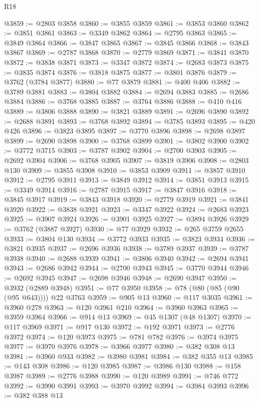 \begin{lexlean}{R18}
\begin{coremodule}
@3859 := @2803 @3858
@3860 := @3855 @3859
@3861 := @3853 @3860
@3862 := @3851 @3861
@3863 := @3349 @3862
@3864 := @2795 @3863
@3865 := @3849 @3864
@3866 := @3847 @3865
@3867 := @3845 @3866
@3868 := @3843 @3867
@3869 := @2787 @3868
@3870 := @2779 @3869
@3871 := @3841 @3870
@3872 := @3838 @3871
@3873 := @3347 @3872
@3874 := @2683 @3873
@3875 := @3835 @3874
@3876 := @3818 @3875
@3877 := @3801 @3876
@3879 := @3762 (@3784 @3877)
@3880 := @77 @3879
@3881 := @400 @406
@3882 := @3789 @3881
@3883 := @3804 @3882
@3884 := @2694 @3883
@3885 := @2686 @3884
@3886 := @3768 @3885
@3887 := @3764 @3886
@3888 := @410 @416
@3889 := @3806 @3888
@3890 := @3821 @3889
@3891 := @2696 @3890
@3892 := @2688 @3891
@3893 := @3768 @3892
@3894 := @3785 @3893
@3895 := @420 @426
@3896 := @3823 @3895
@3897 := @3770 @3896
@3898 := @2698 @3897
@3899 := @2690 @3898
@3900 := @3768 @3899
@3901 := @3802 @3900
@3902 := @3772 @3715
@3903 := @3787 @3902
@3904 := @2700 @3903
@3905 := @2692 @3904
@3906 := @3768 @3905
@3907 := @3819 @3906
@3908 := @2803 @130
@3909 := @3855 @3908
@3910 := @3853 @3909
@3911 := @3857 @3910
@3912 := @2795 @3911
@3913 := @3849 @3912
@3914 := @3851 @3913
@3915 := @3349 @3914
@3916 := @2787 @3915
@3917 := @3847 @3916
@3918 := @3845 @3917
@3919 := @3843 @3918
@3920 := @2779 @3919
@3921 := @3841 @3920
@3922 := @3838 @3921
@3923 := @3347 @3922
@3924 := @2683 @3923
@3925 := @3907 @3924
@3926 := @3901 @3925
@3927 := @3894 @3926
@3929 := @3762 (@3887 @3927)
@3930 := @77 @3929
@3932 := @265 @3759 @2655
@3933 := @3804 @130
@3934 := @3772 @3933
@3935 := @3823 @3934
@3936 := @3821 @3935
@3937 := @2696 @3936
@3938 := @3789 @3937
@3939 := @3787 @3938
@3940 := @2688 @3939
@3941 := @3806 @3940
@3942 := @2694 @3941
@3943 := @2686 @3942
@3944 := @2700 @3943
@3945 := @3770 @3944
@3946 := @2692 @3945
@3947 := @2698 @3946
@3948 := @2690 @3947
@3950 := @3932 (@2889 @3948)
@3951 := @77 @3950
@3958 := @78 (@80 (@85 (@90 (@95 @643)))) @22 @3763
@3959 := @905 @13
@3960 := @117 @3035
@3961 := @3960 @278
@3963 := @120 @3961 @210
@3964 := @3960 @3963
@3965 := @3959 @3964
@3966 := @914 @13
@3969 := @45 @1307 (@48 @1307)
@3970 := @117 @3969
@3971 := @917 @130
@3972 := @192 @3971
@3973 := @2776 @3972
@3974 := @120 @3973
@3975 := @781 @782
@3976 := @3974 @3975
@3977 := @3970 @3976
@3978 := @3966 @3977
@3980 := @382 @308 @13
@3981 := @3960 @933
@3982 := @3980 @3981
@3984 := @382 @355 @13
@3985 := @143 @308
@3986 := @120 @3985
@3987 := @3986 @130
@3988 := @158 @3987
@3989 := @2776 @3988
@3990 := @120 @3989
@3991 := @746 @772
@3992 := @3990 @3991
@3993 := @3970 @3992
@3994 := @3984 @3993
@3996 := @382 @388 @13

\end{coremodule}
\end{lexlean}
